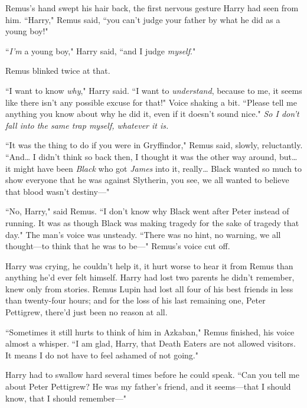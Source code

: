 Remus's hand swept his hair back, the first nervous gesture Harry had seen from him. ``Harry," Remus said, ``you can't judge your father by what he did as a young boy!"

``\emph{I'm} a young boy," Harry said, ``and I judge \emph{myself}."

Remus blinked twice at that.

``I want to know \emph{why}," Harry said. ``I want to \emph{understand}, because to me, it seems like there isn't any possible excuse for that!" Voice shaking a bit. ``Please tell me anything you know about why he did it, even if it doesn't sound nice." \emph{So I don't fall into the same trap myself, whatever it is.}

``It was the thing to do if you were in Gryffindor," Remus said, slowly, reluctantly. ``And{\ldots} I didn't think so back then, I thought it was the other way around, but{\ldots} it might have been \emph{Black} who got \emph{James} into it, really{\ldots} Black wanted so much to show everyone that he was against Slytherin, you see, we all wanted to believe that blood wasn't destiny—"

\later

``No, Harry," said Remus. ``I don't know why Black went after Peter instead of running. It was as though Black was making tragedy for the sake of tragedy that day." The man's voice was unsteady. ``There was no hint, no warning, we all thought—to think that he was to be—" Remus's voice cut off.

Harry was crying, he couldn't help it, it hurt worse to hear it from Remus than anything he'd ever felt himself. Harry had lost two parents he didn't remember, knew only from stories. Remus Lupin had lost all four of his best friends in less than twenty-four hours; and for the loss of his last remaining one, Peter Pettigrew, there'd just been no reason at all.

``Sometimes it still hurts to think of him in Azkaban," Remus finished, his voice almost a whisper. ``I am glad, Harry, that Death Eaters are not allowed visitors. It means I do not have to feel ashamed of not going."

Harry had to swallow hard several times before he could speak. ``Can you tell me about Peter Pettigrew? He was my father's friend, and it seems—that I should know, that I should remember—"

